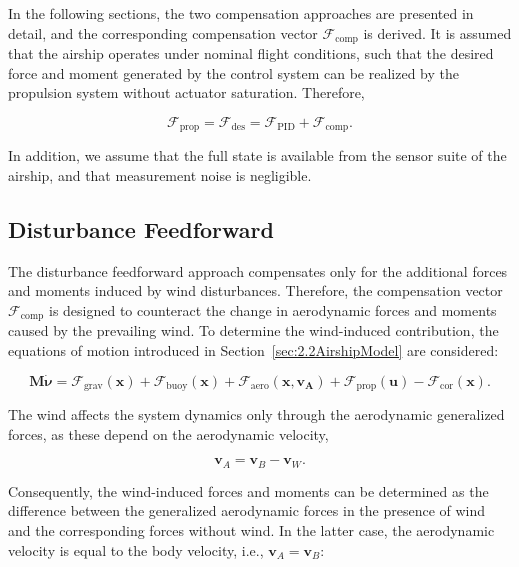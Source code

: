 In the following sections, the two compensation approaches are presented in detail, and the corresponding compensation vector $\bm{\mathcal{F}}_{\text{comp}}$ is derived. It is assumed that the airship operates under nominal flight conditions, such that the desired force and moment generated by the control system can be realized by the propulsion system without actuator saturation. Therefore,

\begin{equation}
	\bm{\mathcal{F}}_\mathrm{prop} 
	= 
	\bm{\mathcal{F}}_\mathrm{des} 
	= 
	\bm{\mathcal{F}}_{\text{PID}} 
	+ 
	\bm{\mathcal{F}}_{\text{comp}}.
	\label{eq:FpropCompensation}
\end{equation}

In addition, we assume that the full state is available from the sensor suite of the airship, and that measurement noise is negligible.





\subsection{Disturbance Feedforward}
\label{sec:DFF}

The disturbance feedforward approach compensates only for the additional forces and moments induced by wind disturbances. Therefore, the compensation vector $\bm{\mathcal{F}}_{\mathrm{comp}}$ is designed to counteract the change in aerodynamic forces and moments caused by the prevailing wind.
To determine the wind-induced contribution, the equations of motion introduced in Section~\ref{sec:2.2AirshipModel} are considered:

\begin{equation}
	\bm{M}\dot{\bm{\nu}}
	=
	\bm{\mathcal{F}}_\mathrm{grav}(\bm{x}) 
	+ 
	\bm{\mathcal{F}}_\mathrm{buoy}(\bm{x}) 
	+ 
	\bm{\mathcal{F}}_\mathrm{aero}(\bm{x}, \bm{v_A}) 
	+ 
	\bm{\mathcal{F}}_\mathrm{prop}(\bm{u})
	- 
	\bm{\mathcal{F}}_\mathrm{cor}(\bm{x}).
	\label{eq:EOMDFF}
\end{equation}

The wind affects the system dynamics only through the aerodynamic generalized forces, as these depend on the aerodynamic velocity,

\begin{equation}
	\bm{v}_A
	=
	\bm{v}_B - \bm{v}_W.
\end{equation} 

Consequently, the wind-induced forces and moments can be determined as the difference between the generalized aerodynamic forces in the presence of wind and the corresponding forces without wind. In the latter case, the aerodynamic velocity is equal to the body velocity, i.e., $\bm{v}_A = \bm{v}_B$:

